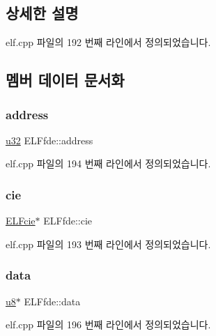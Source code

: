 \subsection{상세한 설명}


elf.\+cpp 파일의 192 번째 라인에서 정의되었습니다.



\subsection{멤버 데이터 문서화}
\mbox{\label{struct_e_l_ffde_a56f664c17014d326fde32fcf334b1f7c}} 
\subsubsection{\texorpdfstring{address}{address}}
{\footnotesize\ttfamily \mbox{\hyperlink{_system_8h_a10e94b422ef0c20dcdec20d31a1f5049}{u32}} E\+L\+Ffde\+::address}



elf.\+cpp 파일의 194 번째 라인에서 정의되었습니다.

\mbox{\label{struct_e_l_ffde_a3ecfd81fe700bcaf54ea8dd4e573066c}} 
\subsubsection{\texorpdfstring{cie}{cie}}
{\footnotesize\ttfamily \mbox{\hyperlink{struct_e_l_fcie}{E\+L\+Fcie}}$\ast$ E\+L\+Ffde\+::cie}



elf.\+cpp 파일의 193 번째 라인에서 정의되었습니다.

\mbox{\label{struct_e_l_ffde_a62e2ad316aaa29267516226b6e8f1e24}} 
\subsubsection{\texorpdfstring{data}{data}}
{\footnotesize\ttfamily \mbox{\hyperlink{_system_8h_aed742c436da53c1080638ce6ef7d13de}{u8}}$\ast$ E\+L\+Ffde\+::data}



elf.\+cpp 파일의 196 번째 라인에서 정의되었습니다.

